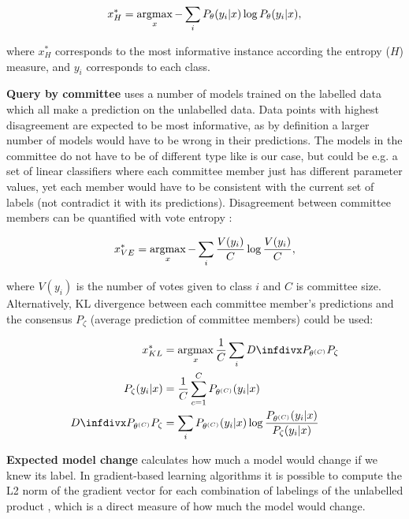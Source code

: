 \begin{equation}
 x^*_H = \operatorname*{argmax}_x - \sum_{i} P_\theta(y_i|x) \log P_\theta(y_i|x),
\end{equation}

where $x^*_H$ corresponds to the most informative instance according the entropy ($H$) measure, and $y_i$ corresponds to each class.

\textbf{Query by committee} uses a number of models trained on the labelled data which all make a prediction on the unlabelled data.
Data points with highest disagreement are expected to be most informative, as by definition a larger number of models would have to be wrong in their predictions.
The models in the committee do not have to be of different type like is our case, but could be e.g. a set of linear classifiers where each committee member just has different parameter values, yet each member would have to be consistent with the current set of labels (not contradict it with its predictions).
Disagreement between committee members can be quantified with vote entropy \cite{vote_entropy}:

\begin{equation}
 x^*_{VE} = \operatorname*{argmax}_x - \sum_{i} \frac{V(y_i)}{C}  \log \frac{V(y_i)}{C},
\end{equation}

where $V(y_i)$ is the number of votes given to class $i$ and $C$ is committee size.
Alternatively, KL divergence between each committee member's predictions and the consensus $P_\zeta$ (average prediction of committee members) could be used:

\begin{align}
 x^*_{KL} &= \argmax_x \frac{1}{C} \sum_{i} \infdiv{P_{\theta^{(C)}}}{P_\zeta}\\
 P_\zeta(y_i | x) &= \frac{1}{C} \sum_{c=1}^C P_{\theta^{(C)}}(y_i|x)\\
 \infdiv{P_{\theta^{(C)}}}{P_\zeta} &= \sum_i  P_{\theta^{(C)}}(y_i|x) \log \frac{ P_{\theta^{(C)}}(y_i|x) }{ P_{\zeta}(y_i|x) }
\end{align}

\textbf{Expected model change} calculates how much a model would change if we knew its label.
In gradient-based learning algorithms it is possible to compute the L2 norm of the gradient vector for each combination of labelings of the unlabelled product \cite{model_change}, which is a direct measure of how much the model would change.

